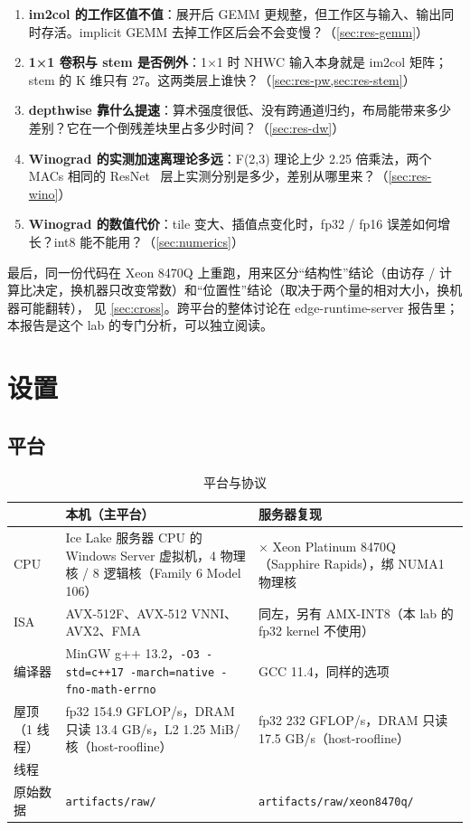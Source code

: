 \documentclass[11pt,a4paper]{ctexart}
\begin{document}
\begin{enumerate}
  \item \textbf{im2col 的工作区值不值}：展开后 GEMM 更规整，但工作区与输入、输出同时存活。implicit GEMM 去掉工作区后会不会变慢？（\cref{sec:res-gemm}）
  \item \textbf{1×1 卷积与 stem 是否例外}：1×1 时 NHWC 输入本身就是 im2col 矩阵；stem 的 K 维只有 27。这两类层上谁快？（\cref{sec:res-pw,sec:res-stem}）
  \item \textbf{depthwise 靠什么提速}：算术强度很低、没有跨通道归约，布局能带来多少差别？它在一个倒残差块里占多少时间？（\cref{sec:res-dw}）
  \item \textbf{Winograd 的实测加速离理论多远}：F(2,3) 理论上少 2.25 倍乘法，两个 MACs 相同的 ResNet~\cite{resnet} 层上实测分别是多少，差别从哪里来？（\cref{sec:res-wino}）
  \item \textbf{Winograd 的数值代价}：tile 变大、插值点变化时，fp32 / fp16 误差如何增长？int8 能不能用？（\cref{sec:numerics}）
\end{enumerate}

最后，同一份代码在 Xeon 8470Q 上重跑，用来区分“结构性”结论（由访存 / 计算比决定，换机器只改变常数）和“位置性”结论（取决于两个量的相对大小，换机器可能翻转），
见 \cref{sec:cross}。跨平台的整体讨论在 edge-runtime-server 报告里；本报告是这个 lab 的专门分析，可以独立阅读。

\section{设置}\label{sec:setup}

\subsection{平台}

\begin{table}[H]
\centering\small
\caption{平台与协议}\label{tab:setup}
\begin{tabularx}{\linewidth}{>{\raggedright\arraybackslash}p{1.7cm} >{\raggedright\arraybackslash}X >{\raggedright\arraybackslash}X}
\toprule
 & 本机（主平台） & 服务器复现 \\
\midrule
CPU & Ice Lake 服务器 CPU 的 Windows Server 虚拟机，4 物理核 / 8 逻辑核（Family 6 Model 106） & 2 × Xeon Platinum 8470Q（Sapphire Rapids），绑 NUMA1 物理核 \\
ISA & AVX-512F、AVX-512 VNNI、AVX2、FMA & 同左，另有 AMX-INT8（本 lab 的 fp32 kernel 不使用） \\
编译器 & MinGW g++ 13.2，\texttt{-O3 -std=c++17 -march=native -fno-math-errno} & GCC 11.4，同样的选项 \\
屋顶（1 线程） & fp32 154.9 GFLOP/s，DRAM 只读 13.4 GB/s，L2 1.25 MiB/核（host-roofline） & fp32 232 GFLOP/s，DRAM 只读 17.5 GB/s（host-roofline） \\
线程 & 1 & 1 \\
原始数据 & \nolinkurl{artifacts/raw/} & \nolinkurl{artifacts/raw/xeon8470q/} \\
\bottomrule
\end{tabularx}
\end{table}
\end{document}
